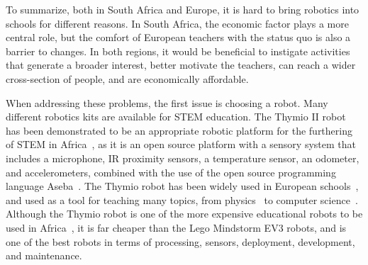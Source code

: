 \documentclass{intech-journal}
\begin{document}
To summarize, both in South Africa and Europe, it is hard to bring robotics into schools for different reasons. 
In South Africa, the economic factor plays a more central role, but the comfort of European teachers with the status quo is also a barrier to changes.
In both regions, it would be beneficial to instigate activities that generate a broader interest, better motivate the teachers, can reach a wider cross-section of people, and are economically affordable.


When addressing these problems, the first issue is choosing a robot.
Many different robotics kits are available for STEM education. 
The Thymio II robot has been demonstrated to be an appropriate robotic platform for the furthering of STEM in Africa~\cite{Gyebi2015}, as it is an open source platform with a sensory system that includes a microphone, IR proximity sensors, a temperature sensor, an odometer, and accelerometers, combined with the use of the open source programming language Aseba~\cite{magnenat2010aseba}. 
The Thymio robot has been widely used in European schools~\cite{roy2015inirobot}, and used as a tool for teaching many topics, from physics~\cite{Mubin2013} to computer science~\cite{magnenat2014}. 
Although the Thymio robot is one of the more expensive educational robots to be used in Africa~\cite{Gyebi2015}, it is far cheaper than the Lego Mindstorm EV3 robots, and is one of the best robots in terms of processing, sensors, deployment, development, and maintenance.
\end{document}
